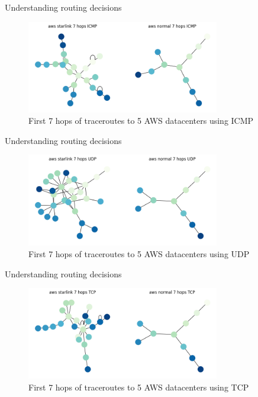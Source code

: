 \documentclass[NET,english,beameralt]{tumbeamer}
\begin{document}
\begin{frame}{Understanding routing decisions}
    \begin{figure}
        \includegraphics[width=0.75\textwidth]{pics/aws_7_icmp.png}
        \caption[short]{First 7 hops of traceroutes to 5 AWS datacenters using ICMP}
    \end{figure}
\end{frame}
\begin{frame}{Understanding routing decisions}
    \begin{figure}
        \includegraphics[width=0.75\textwidth]{pics/aws_7_udp.png}
        \caption[short]{First 7 hops of traceroutes to 5 AWS datacenters using UDP}
    \end{figure}
\end{frame}
\begin{frame}{Understanding routing decisions}
    \begin{figure}
        \includegraphics[width=0.75\textwidth]{pics/aws_7_tcp.png}
        \caption[short]{First 7 hops of traceroutes to 5 AWS datacenters using TCP}
    \end{figure}
\end{frame}
\end{document}
